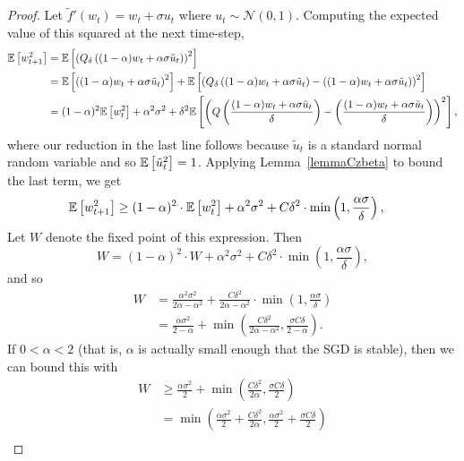 \begin{proof}
  Let $\tilde{f}'(w_t) = w_t + \sigma u_t$ where $u_t\sim \mathcal{N}(0,1)$.
  Computing the expected value of this squared at the next time-step,
\begin{align*}
  \mathbb{E}\left[ w_{t+1}^2 \right]
  &=
  \mathbb{E}\left[  \left( Q_{\delta}\left((1 - \alpha) w_t + \alpha \sigma \tilde u_t \right) \right)^2 \right] \\
  &=
  \mathbb{E}\left[  \left( (1 - \alpha) w_t + \alpha \sigma \tilde u_t \right)^2 \right]
  +
  \mathbb{E}\left[  \left( Q_{\delta}\left((1 - \alpha) w_t + \alpha \sigma \tilde u_t \right) - \left((1 - \alpha) w_t + \alpha \sigma \tilde u_t \right)\right)^2 \right] \\
  &=
  (1 - \alpha)^2 \mathbb{E}\left[  w_t^2  \right] + \alpha^2 \sigma^2
  +
  \delta^2
  \mathbb{E}\left[  \left( Q\left(\frac{(1 - \alpha) w_t + \alpha \sigma \tilde u_t}{\delta} \right) - \left(\frac{(1 - \alpha) w_t + \alpha \sigma \tilde u_t}{\delta} \right)\right)^2 \right],
\end{align*}
where our reduction in the last line follows because $\tilde u_t$ is a standard normal random variable and so $\mathbb{E}\left[ \tilde u_t^2 \right] = 1$.
Applying Lemma~\ref{lemmaCzbeta} to bound the last term, we get
\begin{align*}
  \mathbb{E}\left[ w_{t+1}^2 \right]
  &\ge
  (1 - \alpha)^2 \cdot \mathbb{E}\left[  w_t^2  \right] + \alpha^2 \sigma^2
  +
  C \delta^2 \cdot \min\left(1, \frac{\alpha \sigma}{\delta} \right),
\end{align*}
Let $W$ denote the fixed point of this expression.
Then
\[
  W
  =
  (1 - \alpha)^2 \cdot W + \alpha^2 \sigma^2
  +
  C \delta^2 \cdot \min\left(1, \frac{\alpha \sigma}{\delta} \right),
\]
and so
\begin{align*}
  W
  &=
  \frac{\alpha^2 \sigma^2}{2\alpha - \alpha^2}
  +
  \frac{C \delta^2}{2 \alpha - \alpha^2} \cdot \min\left(1, \frac{\alpha \sigma}{\delta} \right) \\
  &=
  \frac{\alpha \sigma^2}{2 - \alpha}
  +
  \min\left(\frac{C \delta^2}{2 \alpha - \alpha^2}, \frac{\sigma C \delta}{2 - \alpha} \right).
\end{align*}
If $0 < \alpha < 2$ (that is, $\alpha$ is actually small enough that the SGD is stable), then we can bound this with
\begin{align*}
  W
  &\ge
  \frac{\alpha \sigma^2}{2}
  +
  \min\left(\frac{C \delta^2}{2 \alpha}, \frac{\sigma C \delta}{2} \right) \\
  &=
  \min\left(
    \frac{\alpha \sigma^2}{2} + \frac{C \delta^2}{2 \alpha}
  , 
    \frac{\alpha \sigma^2}{2} + \frac{\sigma C \delta}{2}
  \right) \\

\end{align*}
\end{proof}
